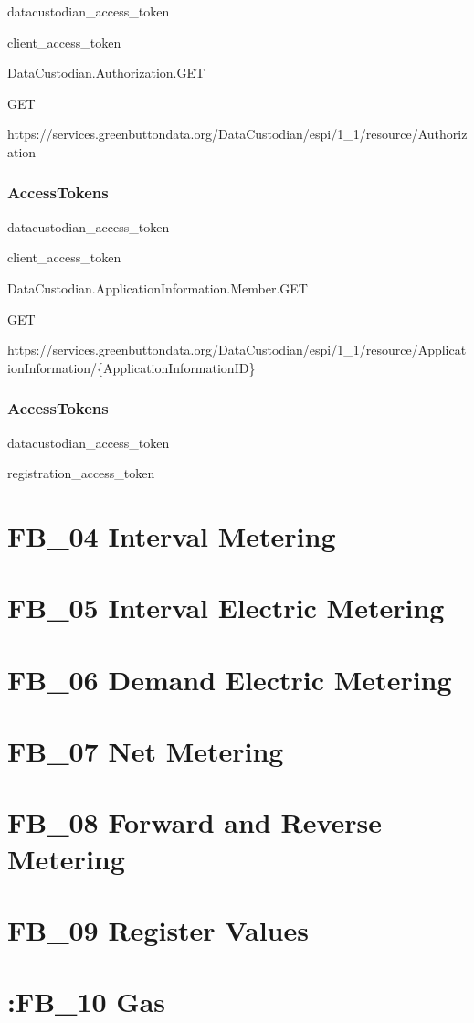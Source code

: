 \documentclass[a4paper,12pt,single,pdftex]{scrbook}
\begin{document}
datacustodian\_access\_token

client\_access\_token

DataCustodian.Authorization.GET

GET

https://services.greenbuttondata.org/DataCustodian/espi/1\_1/resource/Authorization\subsection{AccessTokens}


datacustodian\_access\_token

client\_access\_token

DataCustodian.ApplicationInformation.Member.GET

GET

https://services.greenbuttondata.org/DataCustodian/espi/1\_1/resource/ApplicationInformation/\{ApplicationInformationID\}\subsection{AccessTokens}


datacustodian\_access\_token

registration\_access\_token\chapter{FB\_04 Interval Metering}
\chapter{FB\_05 Interval Electric Metering}
\chapter{FB\_06 Demand Electric Metering}
\chapter{FB\_07 Net Metering}
\chapter{FB\_08 Forward and Reverse Metering}
\chapter{FB\_09 Register Values}
\chapter{:FB\_10 Gas}
\end{document}
